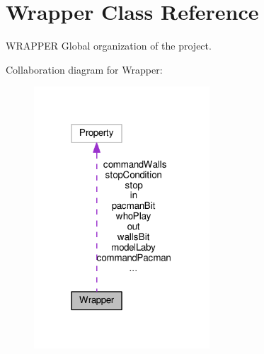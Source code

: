 \hypertarget{class_wrapper}{}\section{Wrapper Class Reference}
\label{class_wrapper}


W\+R\+A\+P\+P\+ER Global organization of the project.  




Collaboration diagram for Wrapper\+:\nopagebreak
\begin{figure}[H]
\begin{center}
\leavevmode
\includegraphics[width=186pt]{class_wrapper__coll__graph}
\end{center}
\end{figure}
